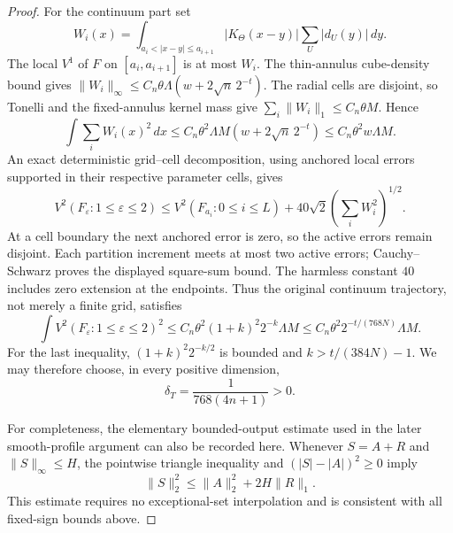 \documentclass[11pt]{article}
\numberwithin{equation}{section}
\theoremstyle{remark}
\theoremstyle{definition}
\newcommand{\norm}[1]{\lVert #1\rVert}
\begin{document}
\begin{proof}
For the continuum part set
\[
 W_i(x)=\int_{a_i<|x-y|\le a_{i+1}}
 |K_\Theta(x-y)|\sum_U|d_U(y)|\,dy.
\]
The local $V^1$ of $F$ on $[a_i,a_{i+1}]$ is at most $W_i$.
The thin-annulus cube-density bound gives
$\norm{W_i}_\infty\le C_n\theta\Lambda(w+2\sqrt n\,2^{-t})$.
The radial cells are disjoint, so Tonelli and the fixed-annulus kernel
mass give $\sum_i\norm{W_i}_1\le C_n\theta M$.  Hence
\[
 \int\sum_iW_i(x)^2\,dx
 \le C_n\theta^2\Lambda M(w+2\sqrt n\,2^{-t})
 \le C_n\theta^2w\Lambda M.
\]
An exact deterministic grid--cell decomposition, using anchored local
errors supported in their respective parameter cells, gives
\begin{equation}\label{eq:griddecomp-one}
 V^2(F_\varepsilon:1\le\varepsilon\le2)
 \le V^2(F_{a_i}:0\le i\le L)
       +40\sqrt2\left(\sum_i W_i^2\right)^{1/2}.
\end{equation}
At a cell boundary the next anchored error is zero, so the active
errors remain disjoint.  Each partition increment meets at most two
active errors; Cauchy--Schwarz proves the displayed square-sum bound.
The harmless constant $40$ includes zero extension at the endpoints.
Thus the original continuum trajectory, not merely a finite grid,
satisfies
\begin{equation}\label{eq:griddecomp}
 \int V^2(F_\varepsilon:1\le\varepsilon\le2)^2
 \le C_n\theta^2(1+k)^2 2^{-k}\Lambda M
 \le C_n\theta^2 2^{-t/(768N)}\Lambda M.
\end{equation}
For the last inequality, $(1+k)^2 2^{-k/2}$ is bounded and
$k>t/(384N)-1$.  We may therefore choose, in every positive dimension,
\[
 \delta_T=\frac1{768(4n+1)}>0.
\]

For completeness, the elementary bounded-output estimate used in the
later smooth-profile argument can also be recorded here.  Whenever
$S=A+R$ and $\norm S_\infty\le H$, the pointwise triangle inequality
and $(|S|-|A|)^2\ge0$ imply
\begin{equation}\label{eq:fixedsign}
 \norm S_2^2\le\norm A_2^2+2H\norm R_1.
\end{equation}
This estimate requires no exceptional-set interpolation and is
consistent with all fixed-sign bounds above.


\end{proof}
\end{document}
